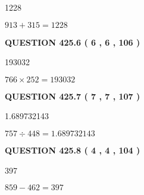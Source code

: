 \documentclass{ctexart}
\begin{document}
 
\noindent{}

1228
 
 
 
 
\noindent{}

$ %
913 +  %
315=   %
1228$
 
 
  
\vspace{0.2in}
  
{\textbf{\Large{QUESTION
425.6 
 ( 6 , 6 , 106 )
}}}
  
  
 
 
\noindent{}

193032
 
 
 
 
\noindent{}

$ %
766 \times  %
252=   %
193032$
 
 
  
\vspace{0.2in}
  
{\textbf{\Large{QUESTION
425.7 
 ( 7 , 7 , 107 )
}}}
  
  
 
 
\noindent{}

1.689732143
 
 
 
 
\noindent{}

$ %
757 \div  %
448=   %
1.689732143$
 
 
  
\vspace{0.2in}
  
{\textbf{\Large{QUESTION
425.8 
 ( 4 , 4 , 104 )
}}}
  
  
 
 
\noindent{}

397
 
 
 
 
\noindent{}

$ %
859 -  %
462=   %
397$
 
\end{document}
